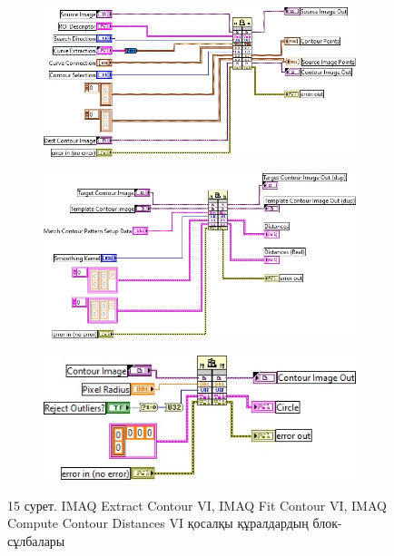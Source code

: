\begin{figure}[H]
    \centering
    \begin{subfigure}[t]{0.49\textwidth}
        \centering
        \includegraphics[width=\textwidth]{media/ict2/image183}
        \caption*{}
    \end{subfigure}
    \begin{subfigure}[t]{0.49\textwidth}
        \centering
        \includegraphics[width=\textwidth]{media/ict2/image184}
        \caption*{}
    \end{subfigure}
    \begin{subfigure}[t]{0.6\textwidth}
        \centering
        \includegraphics[width=\textwidth]{media/ict2/image185}
        \caption*{}
    \end{subfigure}
    \caption*{15 сурет. IMAQ Extract Contour VI, IMAQ Fit Contour VI, IMAQ Compute Contour Distances VI қосалқы құралдардың блок- сұлбалары}
\end{figure}

